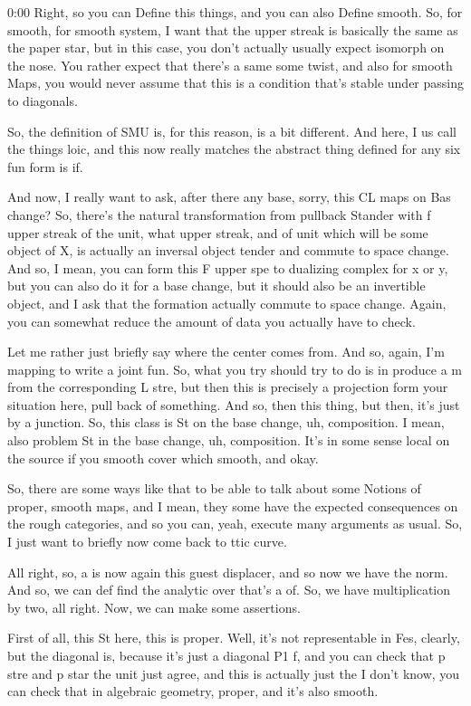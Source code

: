 \begin{unfinished}{0:00}
Right, so you can Define this things, and you can also Define smooth. So, for smooth, for smooth system, I want that the upper streak is basically the same as the paper star, but in this case, you don't actually usually expect isomorph on the nose. You rather expect that there's a same some twist, and also for smooth Maps, you would never assume that this is a condition that's stable under passing to diagonals.

So, the definition of SMU is, for this reason, is a bit different. And here, I us call the things loic, and this now really matches the abstract thing defined for any six fun form is if.

And now, I really want to ask, after there any base, sorry, this CL maps on Bas change? So, there's the natural transformation from pullback Stander with f upper streak of the unit, what upper streak, and of unit which will be some object of X, is actually an inversal object tender and commute to space change. And so, I mean, you can form this F upper spe to dualizing complex for x or y, but you can also do it for a base change, but it should also be an invertible object, and I ask that the formation actually commute to space change. Again, you can somewhat reduce the amount of data you actually have to check.

Let me rather just briefly say where the center comes from. And so, again, I'm mapping to write a joint fun. So, what you try should try to do is in produce a m from the corresponding L stre, but then this is precisely a projection form your situation here, pull back of something. And so, then this thing, but then, it's just by a junction. So, this class is St on the base change, uh, composition. I mean, also problem St in the base change, uh, composition. It's in some sense local on the source if you smooth cover which smooth, and okay.

So, there are some ways like that to be able to talk about some Notions of proper, smooth maps, and I mean, they some have the expected consequences on the rough categories, and so you can, yeah, execute many arguments as usual. So, I just want to briefly now come back to ttic curve.

All right, so, a is now again this guest displacer, and so now we have the norm. And so, we can def find the analytic over that's a of. So, we have multiplication by two, all right. Now, we can make some assertions.

First of all, this St here, this is proper. Well, it's not representable in Fes, clearly, but the diagonal is, because it's just a diagonal P1 f, and you can check that p stre and p star the unit just agree, and this is actually just the I don't know, you can check that in algebraic geometry, proper, and it's also smooth.


\end{unfinished}
